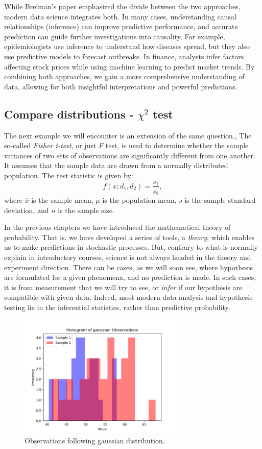 \documentclass{book}
\begin{document}
While Breiman’s paper emphasized the divide between the two approaches, modern data science integrates both. In many cases, understanding causal relationships (inference) can improve predictive performance, and accurate prediction can guide further investigations into causality. For example, epidemiologists use inference to understand how diseases spread, but they also use predictive models to forecast outbreaks. In finance, analysts infer factors affecting stock prices while using machine learning to predict market trends. By combining both approaches, we gain a more comprehensive understanding of data, allowing for both insightful interpretations and powerful predictions.

\newpage
\subsection{Compare distributions - $\chi^{2}$ test}

The next example we will encounter is an extension of the same question., The so-called \textit{Fisher t-test}, or just $F$ test, is used to determine whether the sample variances of two sets of observations are significantly different from one another. It assumes that the sample data are drawn from a normally distributed population. The test statistic is given by:
\[
    f(x; d_{1}, d_{2}) = \frac{s_1}{s_2},
\]
where $\bar{x}$ is the sample mean, $\mu$ is the population mean, $s$ is the sample standard deviation, and $n$ is the sample size.

In the previous chapters we have introduced the mathematical theory of probability. That is, we have developed a series of tools, a \textit{theory}, which enables us to make predictions in stochastic processes. But, contrary to what is normally explain in introductory courses, science is not always headed in the theory and experiment direction. There can be cases, as we will soon see, where hypothesis are formulated for a given phenomena, and no prediction is made. In such cases, it is from measurement that we will try to see, or \textit{infer} if our hypothesis are compatible with given data. Indeed, most modern data analysis and hypothesis testing lie in the inferential statistics, rather than predictive probability.

\begin{figure}[ht]
    \centering
    \includegraphics[width=0.7\textwidth]{figures/chapter4/f_observations.png}
    \caption{Observations following gaussian distribution.}
    \label{fig:f_obs}
\end{figure}
\end{document}
